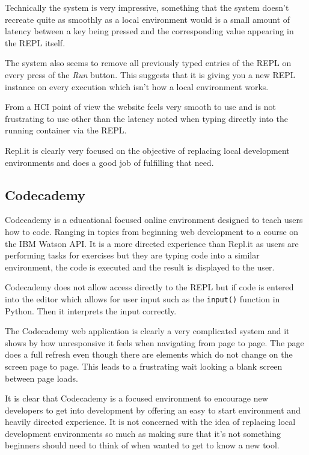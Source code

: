 Technically the system is very impressive, something that the system doesn't recreate quite as smoothly as a local environment would is a small amount of latency between a key being pressed and the corresponding value appearing in the REPL itself.

The system also seems to remove all previously typed entries of the REPL on every press of the \textit{Run} button. This suggests that it is giving you a new REPL instance on every execution which isn't how a local environment works.

From a HCI point of view the website feels very smooth to use and is not frustrating to use other than the latency noted when typing directly into the running container via the REPL.

Repl.it is clearly very focused on the objective of replacing local development environments and does a good job of fulfilling that need.

\subsection{Codecademy}
Codecademy is a educational focused online environment designed to teach users how to code. Ranging in topics from beginning web development to a course on the IBM Watson API. It is a more directed experience than Repl.it as users are performing tasks for exercises but they are typing code into a similar environment, the code is executed and the result is displayed to the user.

Codecademy does not allow access directly to the REPL but if code is entered into the editor which allows for user input such as the \texttt{input()} function in Python. Then it interprets the input correctly.

The Codecademy web application is clearly a very complicated system and it shows by how unresponsive it feels when navigating from page to page. The page does a full refresh even though there are elements which do not change on the screen page to page. This leads to a frustrating wait looking a blank screen between page loads.

It is clear that Codecademy is a focused environment to encourage new developers to get into development by offering an easy to start environment and heavily directed experience. It is not concerned with the idea of replacing local development environments so much as making sure that it's not something beginners should need to think of when wanted to get to know a new tool.


